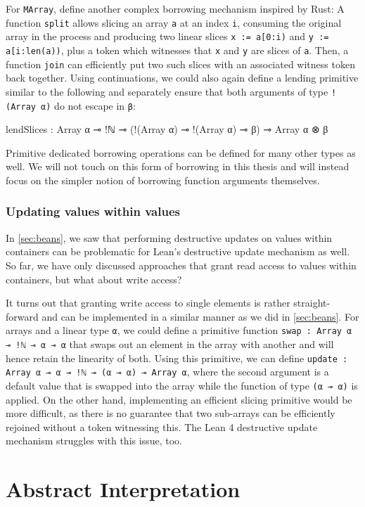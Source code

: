 For \lstinline|MArray|, \cite{spiwack_linearly_2022} define another complex borrowing mechanism inspired by Rust: A function \lstinline|split| allows slicing an array \lstinline|a| at an index \lstinline|i|, consuming the original array in the process and producing two linear slices \lstinline|x := a[0:i)| and \lstinline|y := a[i:len(a))|, plus a token which witnesses that \lstinline|x| and \lstinline|y| are slices of \lstinline|a|. Then, a function \lstinline|join| can efficiently put two such slices with an associated witness token back together. Using continuations, we could also again define a lending primitive similar to the following and separately ensure that both arguments of type \lstinline|!(Array α)| do not escape in \lstinline|β|:\\
\begin{code}
lendSlices : Array α ⊸ !ℕ ⊸ (!(Array α) ⊸ !(Array α) ⊸ β) 
  ⊸ Array α ⊗ β
\end{code}

Primitive dedicated borrowing operations can be defined for many other types as well. We will not touch on this form of borrowing in this thesis and will instead focus on the simpler notion of borrowing function arguments themselves.

\subsubsection{Updating values within values}
In \cref{sec:beans}, we saw that performing destructive updates on values within containers can be problematic for Lean's destructive update mechanism as well. So far, we have only discussed approaches that grant read access to values within containers, but what about write access?

It turns out that granting write access to single elements is rather straight-forward and can be implemented in a similar manner as we did in \cref{sec:beans}. For arrays and a linear type \lstinline|α|, we could define a primitive function \lstinline|swap : Array α ⊸ !ℕ ⊸ α ⊸ α| that swaps out an element in the array with another and will hence retain the linearity of both. Using this primitive, we can define \lstinline|update : Array α ⊸ α ⊸ !ℕ ⊸ (α ⊸ α) ⊸ Array α|, where the second argument is a default value that is swapped into the array while the function of type \lstinline|(α ⊸ α)| is applied. On the other hand, implementing an efficient slicing primitive would be more difficult, as there is no guarantee that two sub-arrays can be efficiently rejoined without a token witnessing this. The Lean 4 destructive update mechanism struggles with this issue, too.

\section{Abstract Interpretation}